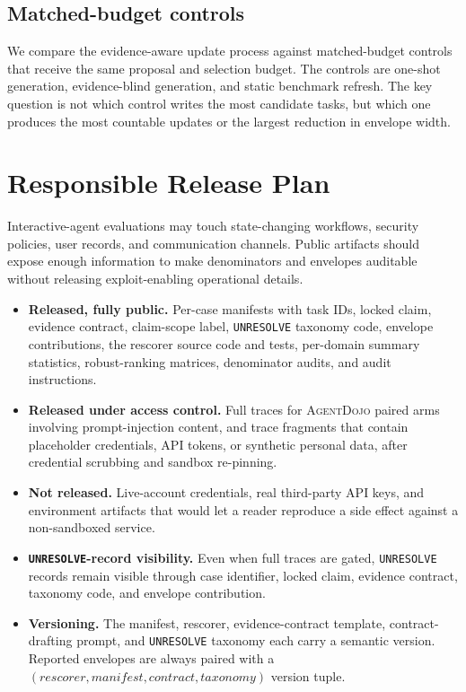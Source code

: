 \documentclass{article}
\newcommand{\agentdojo}{\textsc{AgentDojo}\xspace}
\begin{document}
\subsection{Matched-budget controls}

We compare the evidence-aware update process against matched-budget controls
that receive the same proposal and selection budget. The controls are one-shot
generation, evidence-blind generation, and static benchmark refresh. The key
question is not which control writes the most candidate tasks, but which one
produces the most countable updates or the largest reduction in envelope width.

\section{Responsible Release Plan}
\label{app:release}

Interactive-agent evaluations may touch state-changing workflows, security
policies, user records, and communication channels. Public artifacts should
expose enough information to make denominators and envelopes auditable without
releasing exploit-enabling operational details.

\begin{itemize}\itemsep0.15em
\item \textbf{Released, fully public.} Per-case manifests with task IDs,
locked claim, evidence contract, claim-scope label, \texttt{UNRESOLVE} taxonomy
code, envelope contributions, the rescorer source code and tests, per-domain
summary statistics, robust-ranking matrices, denominator audits, and audit
instructions.
\item \textbf{Released under access control.} Full traces for \agentdojo paired
arms involving prompt-injection content, and trace fragments that contain
placeholder credentials, API tokens, or synthetic personal data, after
credential scrubbing and sandbox re-pinning.
\item \textbf{Not released.} Live-account credentials, real third-party API
keys, and environment artifacts that would let a reader reproduce a side effect
against a non-sandboxed service.
\item \textbf{\texttt{UNRESOLVE}-record visibility.} Even when full traces are
gated, \texttt{UNRESOLVE} records remain visible through case identifier,
locked claim, evidence contract, taxonomy code, and envelope contribution.
\item \textbf{Versioning.} The manifest, rescorer, evidence-contract template,
contract-drafting prompt, and \texttt{UNRESOLVE} taxonomy each carry a semantic
version. Reported envelopes are always paired with a
\((\textit{rescorer},\textit{manifest},\textit{contract},\textit{taxonomy})\)
version tuple.
\end{itemize}
\end{document}
